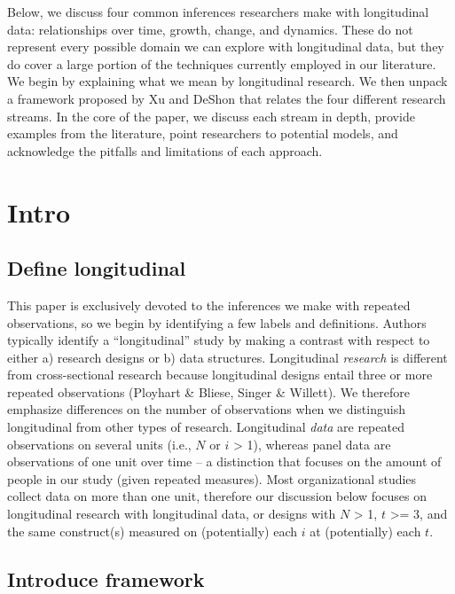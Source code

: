 \documentclass[english,,man]{apa6}
\theoremstyle{definition}
\theoremstyle{definition}
\theoremstyle{definition}
\theoremstyle{remark}
\begin{document}
Below, we discuss four common inferences researchers make with
longitudinal data: relationships over time, growth, change, and
dynamics. These do not represent every possible domain we can explore
with longitudinal data, but they do cover a large portion of the
techniques currently employed in our literature. We begin by explaining
what we mean by longitudinal research. We then unpack a framework
proposed by Xu and DeShon that relates the four different research
streams. In the core of the paper, we discuss each stream in depth,
provide examples from the literature, point researchers to potential
models, and acknowledge the pitfalls and limitations of each approach.

\hypertarget{intro}{%
\section{Intro}\label{intro}}

\hypertarget{define-longitudinal}{%
\subsection{Define longitudinal}\label{define-longitudinal}}

This paper is exclusively devoted to the inferences we make with
repeated observations, so we begin by identifying a few labels and
definitions. Authors typically identify a \enquote{longitudinal} study
by making a contrast with respect to either a) research designs or b)
data structures. Longitudinal \emph{research} is different from
cross-sectional research because longitudinal designs entail three or
more repeated observations (Ployhart \& Bliese, Singer \& Willett). We
therefore emphasize differences on the number of observations when we
distinguish longitudinal from other types of research. Longitudinal
\emph{data} are repeated observations on several units (i.e., \(N\) or
\(i\) \textgreater{} 1), whereas panel data are observations of one unit
over time -- a distinction that focuses on the amount of people in our
study (given repeated measures). Most organizational studies collect
data on more than one unit, therefore our discussion below focuses on
longitudinal research with longitudinal data, or designs with \(N\)
\textgreater{} 1, \(t\) \textgreater{}= 3, and the same construct(s)
measured on (potentially) each \(i\) at (potentially) each \(t\).

\hypertarget{introduce-framework}{%
\subsection{Introduce framework}\label{introduce-framework}}
\end{document}
